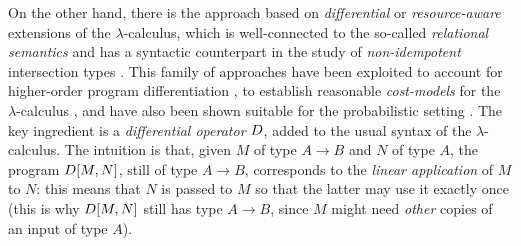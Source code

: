 On the other hand, there is the approach based on \emph{differential} \cite{difflambda} or \emph{resource-aware} \cite{Boudol1993} extensions of the $\lambda$-calculus, which is well-connected to the so-called \emph{relational semantics} \cite{Manzo2012, Manzo2013, dill} and has a syntactic counterpart in the study of \emph{non-idempotent} intersection types \cite{decarvalho2018, Mazza2016}. This family of approaches have been exploited to account for higher-order program differentiation \cite{difflambda}, to establish reasonable \emph{cost-models} for the $\lambda$-calculus \cite{Accattoli2021}, and have also been shown suitable for the probabilistic setting \cite{Manzo2013, Breuvart2018, PistoneLICS2022}. 
The key ingredient is a \emph{differential operator} $\Der$,  added to the usual syntax of the $\lambda$-calculus. The intuition is that, given $M$ of type $A\to B$ and $N$ of type $A$, the program $\Diff{M}{N}$, still of type $A\to B$, corresponds to the \emph{linear application} of $M$ to $N$: this means that $N$ is passed to $M$ so that the latter may use it exactly once (this is why $\Diff{M}{N}$ still has type $A\to B$, since $M$ might need \emph{other} copies of an input of type $A$). 







